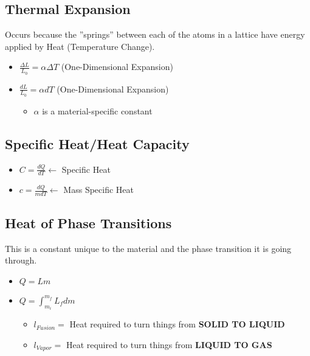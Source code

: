 \documentclass[10pt,letterpaper,final,twoside,notitlepage]{article}
\numberwithin{equation}{section} %
\theoremstyle{definition}
\begin{document}
	\subsection*{Thermal Expansion} \label{subsec:Thermal Expansion}
	Occurs because the ''springs'' between each of the atoms in a lattice have energy applied by Heat (Temperature Change).
		\begin{itemize}
			\item $\frac{\Delta L}{L_{0}} = \alpha \Delta T$ (One-Dimensional Expansion)
			\item $\frac{dL}{L_{0}} = \alpha dT$ (One-Dimensional Expansion)
			\begin{itemize}[noitemsep, nolistsep]
				\item $\alpha$ is a material-specific constant
			\end{itemize}
		\end{itemize}
	
	\subsection*{Specific Heat/Heat Capacity} \label{subsec:Specific Heat/Heat Capacity}
		\begin{itemize}
			\item $C = \frac{dQ}{dT} \leftarrow$ Specific Heat
			\item $c = \frac{dQ}{mdT} \leftarrow$ Mass Specific Heat
		\end{itemize}
	
	\subsection*{Heat of Phase Transitions} \label{subec:Heat Phase Transitions}
	This is a constant unique to the material and the phase transition it is going through.
	\begin{itemize}[nolistsep]
		\item $Q = Lm$
		\item $Q = \int_{m_{i}}^{m_{f}} L_{f} dm$
		\begin{itemize}[noitemsep, nolistsep]
			\item $l_{Fusion} = $ Heat required to turn things from \textbf{SOLID TO LIQUID}
			\item $l_{Vapor} = $ Heat required to turn things from \textbf{LIQUID TO GAS}
		\end{itemize}
	\end{itemize}
\end{document}
